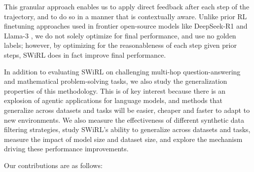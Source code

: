 \documentclass{article} %
\begin{document}
This granular approach enables us to apply direct feedback after each step of the trajectory, and to do so in a manner that is contextually aware. Unlike prior RL finetuning approaches used in frontier open-source models like DeepSeek-R1 \citep{deepseekr1} and Llama-3 \citep{grattafiori2024llama3herdmodels}, we do not solely optimize for final performance, and use no golden labels; however, by optimizing for the reasonableness of each step given prior steps, SWiRL does in fact improve final performance. 


In addition to evaluating SWiRL on challenging multi-hop question-answering and mathematical problem-solving tasks, we also study the generalization properties of this methodology. This is of key interest because there is an explosion of agentic applications for language models, and methods that generalize across datasets and tasks will be easier, cheaper and faster to adapt to new environments.
We also measure the effectiveness of different synthetic data filtering strategies, study SWiRL's ability to generalize across datasets and tasks, measure the impact of model size and dataset size, and explore the mechanism driving these performance improvements.

Our contributions are as follows: 
\end{document}
